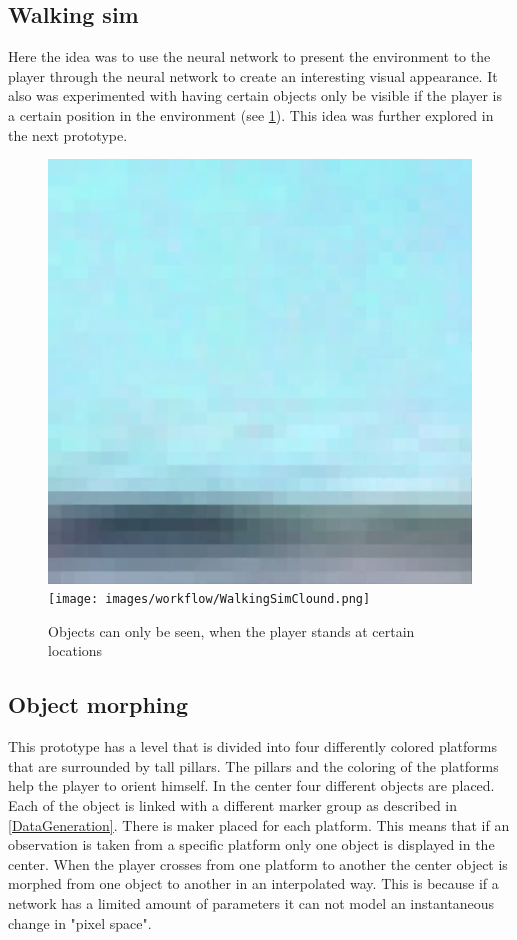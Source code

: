 \subsection{Walking sim}
Here the idea was to use the neural network to present the environment to the player through the neural network to create an interesting visual appearance. It also was experimented with having certain objects only be visible if the player is a certain position in the environment (see \cref{WalkingSim}). This idea was further explored in the next prototype.

\begin{figure}[p]
  \centering
  \includegraphics[width=\imgWidth]{images/workflow/WalkingSimNothing.png} \\[\picVdist]
  \texttt{[image: images/workflow/WalkingSimClound.png]}
  \caption{Objects can only be seen, when the player stands at certain locations}
  \label{WalkingSim}
\end{figure}


\subsection{Object morphing}
This prototype has a level that is divided into four differently colored platforms that are surrounded by tall pillars. The pillars and the coloring of the platforms help the player to orient himself. In the center four different objects are placed. Each of the object is linked with a different marker group as described in \cref{DataGeneration}. There is maker placed for each platform. This means that if an observation is taken from a specific platform only one object is displayed in the center. When the player crosses from one platform to another the center object is morphed from one object to another in an interpolated way. This is because if a network has a limited amount of parameters it can not model an instantaneous change in "pixel space".



